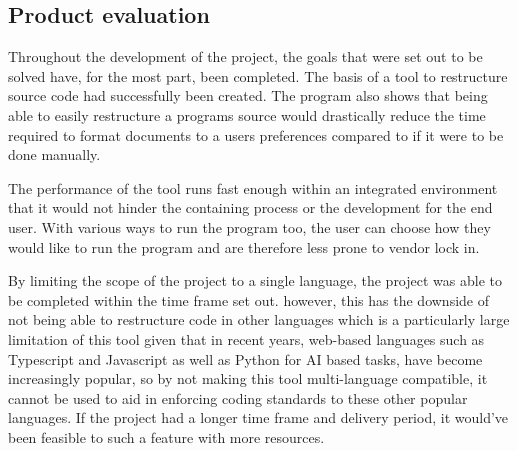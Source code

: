 
\subsection{Product evaluation}

Throughout the development of the project, the goals that were set out to be solved have, for the most part, been completed. The basis of a tool to restructure source code had successfully been created. The program also shows that being able to easily restructure a programs source would drastically reduce the time required to format documents to a users preferences compared to if it were to be done manually.

The performance of the tool runs fast enough within an integrated environment that it would not hinder the containing process or the development for the end user.
With various ways to run the program too, the user can choose how they would like to run the program and are therefore less prone to vendor lock in.

By limiting the scope of the project to a single language, the project was able to be completed within the time frame set out. however, this has the downside of not being able to restructure code in other languages which is a particularly large limitation of this tool given that in recent years, web-based languages such as Typescript and Javascript as well as Python for AI based tasks, have become increasingly popular, so by not making this tool multi-language compatible, it cannot be used to aid in enforcing coding standards to these other popular languages. If the project had a longer time frame and delivery period, it would've been feasible to such a feature with more resources.

